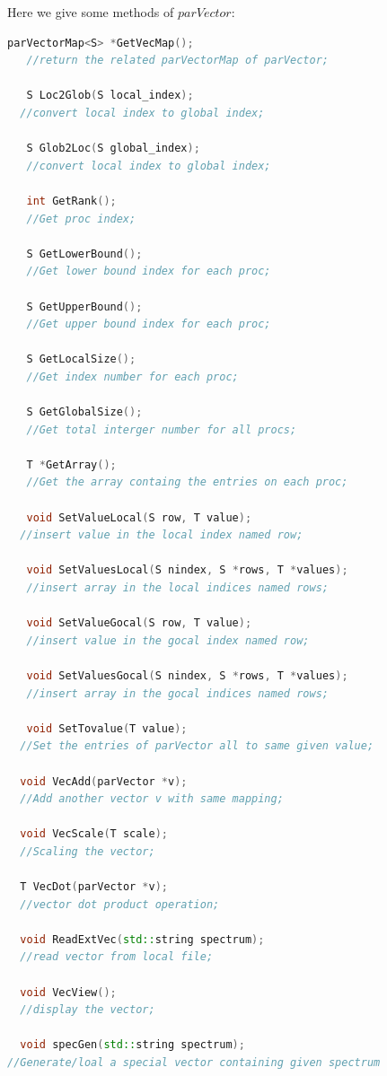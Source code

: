 \documentclass[a4paper, 10 pt]{report}
\begin{document}
Here we give some methods of $parVector$:

   	\begin{lstlisting}[language=C++,frame=single]
   parVectorMap<S> *GetVecMap();
   //return the related parVectorMap of parVector;

   S Loc2Glob(S local_index);
  //convert local index to global index;

   S Glob2Loc(S global_index);
   //convert local index to global index;
   
   int GetRank();
   //Get proc index;
   
   S GetLowerBound();
   //Get lower bound index for each proc;
   
   S GetUpperBound();
   //Get upper bound index for each proc;
   
   S GetLocalSize();
   //Get index number for each proc;
   
   S GetGlobalSize();
   //Get total interger number for all procs;
   
   T *GetArray();
   //Get the array containg the entries on each proc;
  
   void SetValueLocal(S row, T value);
  //insert value in the local index named row;
  
   void SetValuesLocal(S nindex, S *rows, T *values);
   //insert array in the local indices named rows;
 
   void SetValueGocal(S row, T value);
   //insert value in the gocal index named row;

   void SetValuesGocal(S nindex, S *rows, T *values);
   //insert array in the gocal indices named rows;
 
   void SetTovalue(T value);
  //Set the entries of parVector all to same given value;
  
  void VecAdd(parVector *v);
  //Add another vector v with same mapping;
  
  void VecScale(T scale);
  //Scaling the vector;
  
  T VecDot(parVector *v);
  //vector dot product operation;
  
  void ReadExtVec(std::string spectrum);
  //read vector from local file;
  
  void VecView();
  //display the vector;
  
  void specGen(std::string spectrum);
//Generate/loal a special vector containing given spectrum
  
   \end{lstlisting}
	
\end{document}
